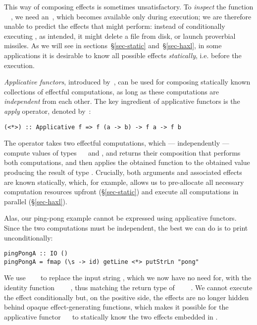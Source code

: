 This way of composing effects is sometimes unsatisfactory. To \emph{inspect} the
function \hs{\s}~\hs{->}~, we need an~, which becomes available
only during execution; we are therefore unable to predict the effects that
 might perform: instead of conditionally executing ,
as intended, it might delete a file from disk, or launch proverbial missiles. As
we will see in sections~\S\ref{sec-static} and~\S\ref{sec-haxl}, in some
applications it is desirable to know all possible effects \emph{statically},
i.e. before the execution.

\emph{Applicative functors}, introduced by~\citet{mcbride2008applicative}, can
be used for composing statically known collections of effectful computations, as
long as these computations are \emph{independent} from each other. The key
ingredient of applicative functors is the \emph{apply} operator, denoted
by~\hs{<*>}:

\vspace{1mm}
\begin{verbatim}
(<*>) :: Applicative f => f (a -> b) -> f a -> f b
\end{verbatim}
\vspace{1mm}
\newpage

\noindent
The operator takes two effectful computations, which --- independently ---
compute values of types ~\hs{->}~ and , and returns their
composition that performs both computations, and then applies the obtained
function to the obtained value producing the result of type . Crucially,
both arguments and associated effects are known statically, which, for example,
allows us to pre-allocate all necessary computation resources upfront
(\S\ref{sec-static}) and execute all computations in parallel
(\S\ref{sec-haxl}).

Alas, our ping-pong example cannot be expressed using applicative functors.
Since the two computations must be independent, the best we can do is to print
 unconditionally:

\vspace{0.5mm}
\begin{verbatim}
pingPongA :: IO ()
pingPongA = fmap (\s -> id) getLine <*> putStrLn "pong"
\end{verbatim}
\vspace{0.5mm}

\noindent
We use ~\hs{(\s}~\hs{->}~ to replace the input string ,
which we now have no need for, with the identity function
~\hs{::}~\hs{()}~\hs{->}~\hs{()}, thus matching the return type of
~~\hs{::}~~\hs{()}. We cannot execute the
 effect conditionally but, on the positive side, the effects are no
longer hidden behind opaque effect-generating functions, which makes it possible
for the applicative functor ~\hs{=}~ to statically know the two
effects embedded in .

